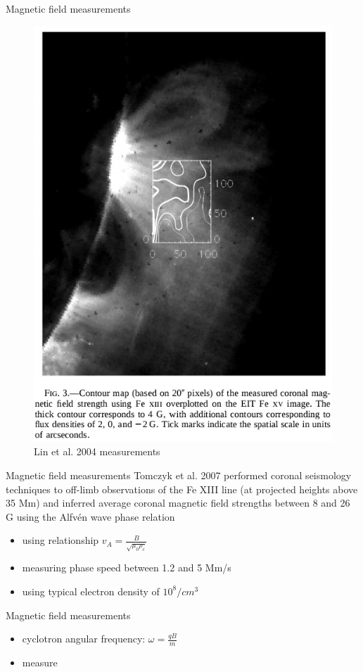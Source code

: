 \documentclass{beamer}
\begin{document}
\begin{frame}{Magnetic field measurements}

\begin{figure}[H]
 \centering
 \includegraphics[scale=0.27]{l1.png}
\caption{Lin et al. 2004 measurements}
\end{figure}


\end{frame}

\begin{frame}{Magnetic field measurements}
Tomczyk et al. 2007 performed coronal seismology techniques  to off-limb observations of
the Fe XIII line (at projected heights above 35 Mm) and
inferred average coronal magnetic field strengths between 8
and 26 G using the Alfv\'en wave phase relation

\begin{itemize}
\item using relationship $v_A=\frac{B}{\sqrt{\mu_0 \rho_c}}$
\item measuring phase speed between 1.2 and 5 Mm/s
\item using typical electron density of $10^8 /cm^3$
\end{itemize}

\end{frame}




\begin{frame}{Magnetic field measurements}

\begin{itemize}
\item cyclotron angular frequency: $\omega = \frac{qB}{m}$
\item measure 
\end{itemize}
\end{frame}
\end{document}
